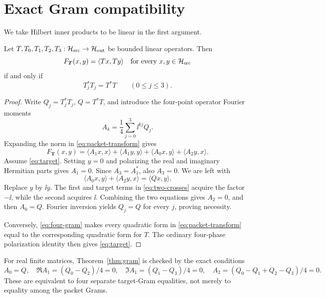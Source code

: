 \section{Exact Gram compatibility}

We take Hilbert inner products to be linear in the first argument.

\begin{theorem}
\label{thm:gram}
Let $T,T_0,T_1,T_2,T_3:\mathcal H_{\rm src}\to\mathcal H_{\rm out}$ be bounded linear operators.  Then
\begin{equation}
 F_{\boldsymbol T}(x,y)=\langle Tx,Ty\rangle
 \quad\text{for every }x,y\in\mathcal H_{\rm src}
 \label{eq:target}
\end{equation}
if and only if
\begin{equation}
 T_j^*T_j=T^*T\qquad(0\leq j\leq3).
 \label{eq:four-gram}
\end{equation}
\end{theorem}

\begin{proof}
Write $Q_j=T_j^*T_j$, $Q=T^*T$, and introduce the four-point operator Fourier
moments
\[
 A_k=\frac14\sum_{j=0}^3\ii^{kj}Q_j.
\]
Expanding the norm in \eqref{eq:packet-transform} gives
\begin{equation}
 F_{\boldsymbol T}(x,y)=
 \langle A_1x,x\rangle+\langle A_1y,y\rangle
 +\langle A_0x,y\rangle+\langle A_2y,x\rangle.
 \label{eq:dft-expansion}
\end{equation}
Assume \eqref{eq:target}.  Setting $y=0$ and polarizing the real and imaginary
Hermitian parts gives $A_1=0$.  Since $A_3=A_1^*$, also $A_3=0$.  We are left with
\begin{equation}
 \langle A_0x,y\rangle+\langle A_2y,x\rangle=\langle Qx,y\rangle.
 \label{eq:two-crosses}
\end{equation}
Replace $y$ by $\ii y$.  The first and target terms in
\eqref{eq:two-crosses} acquire the factor $-\ii$, while the second acquires $\ii$.
Combining the two equations gives $A_2=0$, and then $A_0=Q$.  Fourier inversion yields
$Q_j=Q$ for every $j$, proving necessity.

Conversely, \eqref{eq:four-gram} makes every quadratic form in
\eqref{eq:packet-transform} equal to the corresponding quadratic form for $T$.
The ordinary four-phase polarization identity then gives \eqref{eq:target}.
\end{proof}

For real finite matrices, Theorem~\ref{thm:gram} is checked by the exact conditions
\[
 A_0=Q,\quad
 \Re A_1=(Q_0-Q_2)/4=0,\quad
 \Im A_1=(Q_1-Q_3)/4=0,\quad
 A_2=(Q_0-Q_1+Q_2-Q_3)/4=0.
\]
These are equivalent to four separate target-Gram equalities, not merely to equality
among the packet Grams.
